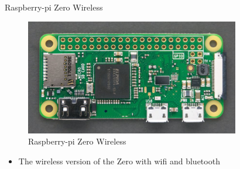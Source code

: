 \begin{frame}
   {Raspberry-pi Zero Wireless}
   \begin{figure}[H]
      \includegraphics[height=2in]{IMAGES/rpi0w}
      \caption{Raspberry-pi Zero Wireless}
   \end{figure}
   \begin{itemize}
      \item The wireless version of the Zero with wifi and bluetooth
   \end{itemize}
\end{frame}

\cprotect{}

